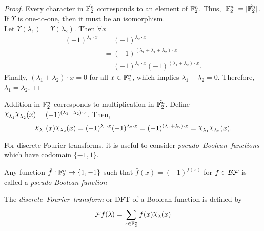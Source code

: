\begin{proof}
	Every character in $\hat{\mathbb{F}_2^n}$ corresponds to an element of
  $\mathbb{F}_2^n$. Thus, $\lvert\mathbb{F}_2^n\rvert=\lvert\hat{\mathbb{F}_2^n}\rvert$. If
  $\Upsilon$ is one-to-one, then
	it must be an isomorphism.\\
	Let $\Upsilon(\lambda_1)=\Upsilon(\lambda_2)$. Then $\forall x$
	\begin{align*}
		(-1)^{\lambda_1\cdot x}
      &=(-1)^{\lambda_2\cdot x}\\
		  &=(-1)^{(\lambda_1+\lambda_1+\lambda_2)\cdot x}\\
      &=(-1)^{\lambda_1\cdot x}(-1)^{(\lambda_1+\lambda_2)\cdot x}.
	\end{align*}
	Finally, $(\lambda_1+\lambda_2)\cdot x=0$ for all $x\in\mathbb{F}_2^n$, which
  implies $\lambda_1+\lambda_2=0$. Therefore, $\lambda_1=\lambda_2$.
\end{proof}

\par Addition in $\mathbb{F}_2^n$ corresponds to multiplication in
$\hat{\mathbb{F}_2^n}$. Define
$\Chi_{\lambda_1}\Chi_{\lambda_2}(x)=(-1)^{(\lambda_1+\lambda_2)\cdot x}$.
Then,
\[
\Chi_{\lambda_1}(x)\Chi_{\lambda_2}(x)
  =(-1)^{\lambda_1\cdot x}(-1)^{\lambda_2\cdot x}
  =(-1)^{(\lambda_1+\lambda_2)\cdot x}
  =\Chi_{\lambda_1}\Chi_{\lambda_2}(x).
\]

\par For discrete Fourier transforms, it is useful to consider {\em pseudo\ 
Boolean\ functions}
which have codomain $\{-1,1\}$. 

\begin{definition}\label{def:pBF}
	Any function $\hat{f}:\mathbb{F}_2^n\rightarrow\{1,-1\}$ such that
  $\hat{f}(x)=(-1)^{f(x)}$ for $f\in\mathcal{BF}$ is called a {\em pseudo Boolean
  function}
\end{definition}

\begin{definition}\label{def:DFT}
	The {\em discrete\ Fourier\ transform} or DFT of a Boolean function is
  defined by
	\begin{equation}\label{eqn:DFT}
    \mathcal{F}f(\lambda)
      =\sum_{x\in\gftwo^n}f(x)\Chi_\lambda(x)
	\end{equation}
\end{definition}


